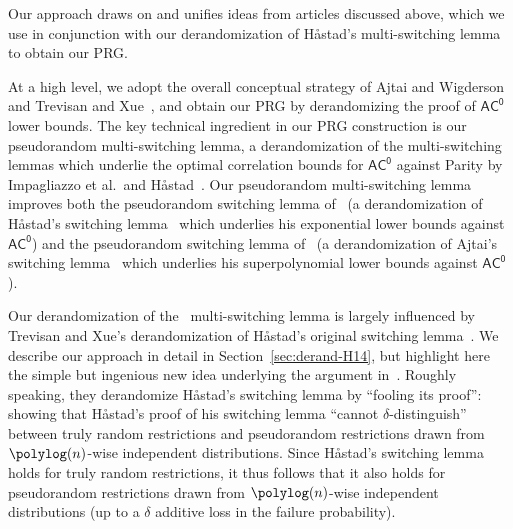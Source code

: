 \documentclass{toc}
\newcommand{\pparagraph}[1]{\medskip \noindent {\bf {#1}}}
\theoremstyle{plain}
\newcommand{\acz}{\mathsf{AC^0}}
\begin{document}
\pparagraph{Our approach.}  Our approach draws on and unifies ideas
%
{}from  %
%
articles \cite{AjtaiWigderson:85,TX13,HS16journal}  %
%
%
%
discussed above, which we use in conjunction with our derandomization of 
%
H{\aa}stad's multi-switching lemma~\cite{Has14} %
to obtain our PRG.

At a high level, we adopt the overall conceptual strategy of Ajtai and Wigderson~\cite{AjtaiWigderson:85} and Trevisan and Xue~\cite{TX13}, and obtain our PRG by derandomizing the proof of $\acz$ lower bounds.  The key technical ingredient in our PRG construction is our pseudorandom multi-switching lemma, a derandomization of the multi-switching lemmas which underlie the optimal correlation bounds for $\acz$ against {\sc Parity} %
by  %
Impagliazzo et al.~and H{\aa}stad~\cite{IMP12,Has14}.  Our pseudorandom multi-switching lemma improves both the pseudorandom switching lemma of~\cite{TX13} (a derandomization of H{\aa}stad's switching lemma~\cite{Hastad86} which underlies his exponential lower bounds against $\acz$) and the pseudorandom switching lemma of~\cite{AjtaiWigderson:85} (a derandomization of Ajtai's switching lemma~\cite{ajtai1983} which underlies his superpolynomial lower bounds against $\acz$).  


Our derandomization of the~\cite{Has14} multi-switching lemma is largely influenced by Trevisan and Xue's derandomization of H{\aa}stad's original switching lemma~\cite{Hastad86}.  We describe our approach in detail in Section~\ref{sec:derand-H14}, but highlight here the simple but ingenious new idea %
%
underlying the argument in~\cite{TX13}.   %
%
Roughly  %
speaking, they derandomize %
%
H{\aa}stad's  %
switching lemma by ``fooling its proof'':  showing that H{\aa}stad's proof of his switching lemma ``cannot $\delta$-distinguish'' between truly random restrictions and pseudorandom restrictions drawn from $\polylog(n)$-wise independent distributions.  Since H{\aa}stad's switching lemma holds for truly random restrictions, it thus follows that it also holds for pseudorandom restrictions drawn from $\polylog(n)$-wise independent distributions (up to a $\delta$ additive loss in the failure probability). 
\end{document}
